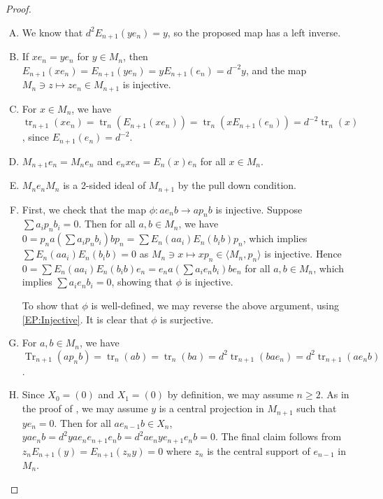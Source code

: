 \documentclass[11pt]{article}
\theoremstyle{plain}
\theoremstyle{definition}
\DeclareMathOperator{\Tr}{Tr}
\DeclareMathOperator{\tr}{tr}
\begin{document}
\begin{proof} 

\begin{enumerate}[(A)]
\item

We know that $d^2E_{n+1}(ye_n) = y $, so the proposed map has a left inverse.

\item

If $xe_n = ye_n$ for $y\in M_n$,  then $E_{n+1}(xe_n) = E_{n+1}(y e_n) = y E_{n+1}(e_n) = d^{-2} y$, and the map $M_n\ni z\mapsto ze_n\in M_{n+1}$ is injective.

\item

For $x\in M_n$, we have $\tr_{n+1}(xe_n) = \tr_n(E_{n+1}(xe_n)) = \tr_n(x E_{n+1}(e_n)) = d^{-2} \tr_n(x)$, since $E_{n+1}(e_n) = d^{-2}$.

\item

$M_{n+1} e_n = M_n e_n$ and $e_nxe_n = E_n(x)e_n$ for all $x\in M_n$.

\item

$M_ne_nM_n$ is a 2-sided ideal of $M_{n+1}$ by the pull down condition.

\item

First, we check that the map $\phi:ae_nb\to ap_nb$ is injective. 
Suppose $\sum a_i p_n b_i = 0$.
Then for all $a,b\in M_n$, we have $0=p_na\left(\sum a_i p_n b_i\right) bp_n = \sum E_{n}(aa_i)E_n(b_ib)p_n$, which implies $\sum E_{n}(aa_i)E_n(b_ib) = 0$ as $M_n \ni x\mapsto xp_n \in \langle M_n, p_n\rangle$ is injective.
Hence $0 = \sum E_{n}(aa_i)E_n(b_ib)e_n = e_na\left(\sum a_i e_n b_i\right) be_n$ for all $a,b\in M_n$, which implies $\sum a_i e_n b_i = 0$, showing that $\phi$ is injective. 

		To show that $\phi$ is well-defined, we may reverse the above argument, using \eqref{EP:Injective}. 
		It is clear that $\phi$ is surjective. 

\item

For $a,b\in M_n$, we have 
$\Tr_{n+1}(ap_n b) = \tr_n(ab) = \tr_n(ba) = d^2\tr_{n+1}(bae_n) = d^2 \tr_{n+1}(ae_n b)$.

\item

Since $X_0 = (0)$ and $X_1 = (0)$ by definition, we may assume $n\geq 2$.
As in the proof of \cite[Thm.~4.6.3.vi]{MR999799}, we may assume $y$ is a central projection in $M_{n+1}$ such that $y e_{n} = 0$.
Then for all $ae_{n-1} b \in X_n$, $y ae_n b = d^2 yae_n e_{n+1}e_n b = d^2 ae_n ye_{n+1} e_n b = 0$.
The final claim follows from $z_{n}E_{n+1}(y) = E_{n+1}(z_n y)= 0$ where $z_n$ is the central support of $e_{n-1}$ in $M_n$.


\end{enumerate}
\end{proof}
\end{document}
